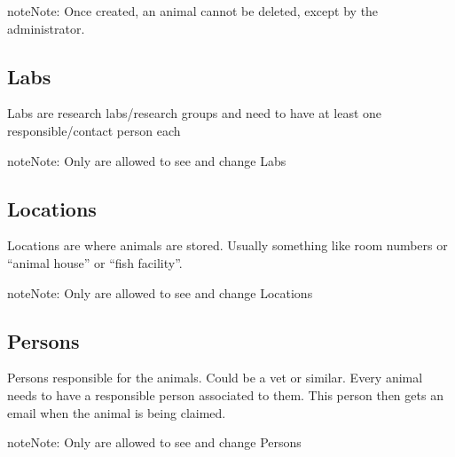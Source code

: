 \documentclass[letterpaper,10pt,openany,oneside,english]{sphinxmanual}
\begin{document}
\begin{sphinxadmonition}{note}{Note:}
Once created, an animal cannot be deleted, except by the administrator.
\end{sphinxadmonition}


\subsection{Labs}
\label{\detokenize{index:labs}}
Labs are research labs/research groups and need to have at least one responsible/contact person each

\noindent{}

\begin{sphinxadmonition}{note}{Note:}
Only  are allowed to see and change Labs
\end{sphinxadmonition}


\subsection{Locations}
\label{\detokenize{index:locations}}
Locations are where animals are stored. Usually something like room numbers or “animal house” or “fish facility”.

\noindent{}

\begin{sphinxadmonition}{note}{Note:}
Only  are allowed to see and change Locations
\end{sphinxadmonition}


\subsection{Persons}
\label{\detokenize{index:persons}}
Persons responsible for the animals. Could be a vet or similar.
Every animal needs to have a responsible person associated to them. This person then gets
an email when the animal is being claimed.

\noindent{}

\begin{sphinxadmonition}{note}{Note:}
Only  are allowed to see and change Persons
\end{sphinxadmonition}
\end{document}
